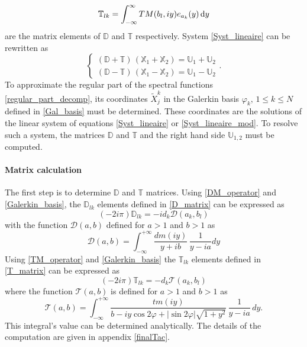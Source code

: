 \begin{equation}
\label{T_matrix}
\mathbb{T}_{lk} = \int_{-\infty}^\infty TM(b_l,iy) e_{a_k}(y) \, {\rm d} y
\end{equation}
are the matrix elements of $\mathbb{D}$ and $\mathbb{T}$ respectively. System \eqref{Syst_lineaire} can be rewritten as
\begin{equation}
\label{Syst_lineaire_mod}
\begin{cases}
(\mathbb{D} + \mathbb{T}) \, (\mathbb{X}_1 + \mathbb{X}_2) = \mathbb{U}_1 +  \mathbb{U}_2\\
(\mathbb{D} - \mathbb{T}) \, (\mathbb{X}_1 - \mathbb{X}_2) = \mathbb{U}_1 - \mathbb{U}_2
\end{cases}.
\end{equation}
To approximate the regular part of the spectral functions \eqref{regular_part_decomp}, its coordinates $\tilde{X}_j^k$ in the Galerkin basis $\varphi_k, \, 1 \leq k \leq N$ defined in \eqref{Gal_basis} must be determined. These coordinates are the solutions of the linear system of equations \eqref{Syst_lineaire} or \eqref{Syst_lineaire_mod}. To resolve such a system, the matrices $\mathbb{D}$ and $\mathbb{T}$ and the right hand side $\mathbb{U}_{1,2}$ must be computed. 

\paragraph{Matrix calculation}

The first step is to determine $\mathbb{D}$ and $\mathbb{T}$ matrices.
Using \eqref{DM_operator} and \eqref{Galerkin_basis}, the $\mathbb{D}_{lk}$ elements defined in \eqref{D_matrix} can be expressed as
\begin{equation}
\label{matrice_D}
(-2i\pi) \mathbb{D}_{lk} =  -i d_k \mathcal{D}(a_k,b_l)
\end{equation}
with the function $\mathcal{D}(a,b)$ defined for $a>1$ and $b>1$ as
\begin{equation}
\label{ldbis}
\mathcal{D}(a,b) = \int_{-\infty}^{+\infty} \dfrac{dm(iy)}{y + ib} \, \dfrac{1}{y -ia} dy 
\end{equation}
Using \eqref{TM_operator} and \eqref{Galerkin_basis} the $\mathbb{T}_{lk}$ elements defined in \eqref{T_matrix} can be expressed as
\begin{equation}
\label{matrice_T}
(-2i\pi) \mathbb{T}_{lk} =  - d_k \mathcal{T}(a_k,b_l)
\end{equation}
where the function $\mathcal{T}(a,b)$ is defined for $a>1$ and $b>1$ as
\begin{equation}
\label{ltbis}
\mathcal{T}(a,b) = \int_{-\infty}^{+\infty} \dfrac{tm(iy)}{ b - iy \cos 2\varphi  + |\sin 2\varphi| \sqrt{1+y^2}} \, \dfrac{1}{y -i a} \, dy . 
\end{equation}
This integral's value can be determined analytically. The details of the computation are given in appendix \ref{finalTac}.

